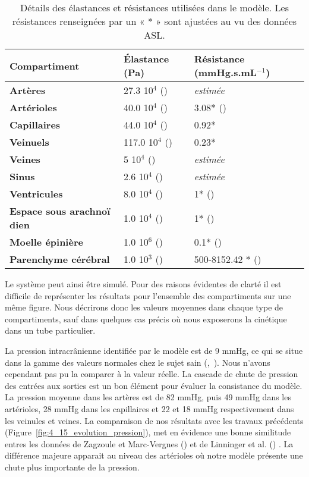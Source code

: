\begin {table}
	\caption{Détails des élastances et résistances utilisées dans le modèle. Les résistances renseignées par un « * » sont
ajustées au vu des données ASL.} 
	\label{tab:elastances} 
	\centering
	\begin{tabularx}{\linewidth}{  X | X | X }

	{\bf Compartiment}  & { \bf \'Elastance (Pa)} & {\bf Résistance (mmHg.s.mL$^{-1}$)} \\
\hline
	{\bf Artères} & 27.3 10$^4$ (\cite{Zagzoule1986}) & {\em estimée}\\
{\bf Artérioles} & 40.0 10$^4$ (\cite{Zagzoule1986}) & 3.08$\ast$ (\cite{Linninger2009}) \\
{\bf Capillaires} & 44.0 10$^4$ (\cite{Zagzoule1986}) & 0.92$\ast$ \\
{\bf Veinuels} & 117.0 10$^4$ (\cite{Zagzoule1986}) & 0.23$\ast$ \\
{\bf Veines} & 5 10$^4$ (\cite{Zagzoule1986}) & {\em estimée}\\
{\bf Sinus} & 2.6 10$^4$ (\cite{Zagzoule1986}) & {\em estimée}\\
{\bf Ventricules} & 8.0 10$^4$ (\cite{Smillie2004}) & 1$\ast$ (\cite{Linninger2009}) \\
{\bf Espace sous arachno\"i dien} & 1.0 10$^4$ (\cite{Zagzoule1986}) & 1$\ast$ (\cite{Linninger2009}) \\
{\bf Moelle épinière} & 1.0 10$^6$ (\cite{Smillie2004}) & 0.1$\ast$ (\cite{Linninger2009}) \\
{\bf Parenchyme cérébral} & 1.0 10$^3$ (\cite{Smillie2004}) & 500-8152.42 $\ast$ (\cite{Linninger2009}) \\
	\end{tabularx}
\end{table}





Le système peut ainsi être simulé. Pour des raisons évidentes de clarté il est difficile de
représenter les résultats pour l’ensemble des compartiments sur une même figure. Nous décrirons
donc les valeurs moyennes dans chaque type de compartiments, sauf dans quelques cas précis où nous
exposerons la cinétique dans un tube particulier.

La pression intracrânienne identifiée par le modèle est de 9 mmHg, ce qui se situe dans la
gamme des valeurs normales chez le sujet sain (\cite{Steiner2006},~\cite{Pattinson2005}). Nous n’avons cependant pas pu la comparer
à la valeur réelle. La cascade de chute de pression des entrées aux sorties est un bon élément pour
évaluer la consistance du modèle. La pression moyenne dans les artères est de 82 mmHg, puis 49
mmHg dans les artérioles, 28 mmHg dans les capillaires et 22 et 18 mmHg respectivement dans les
veinules et veines. La comparaison de nos résultats avec les travaux précédents (Figure~\ref{fig:4_15_evolution_pression}), met en évidence une bonne similitude entres les données de Zagzoule et Marc-Vergnes (\cite{Zagzoule1986}) et de Linninger
et al. (\cite{Linninger2009}) . La différence majeure apparait au niveau des artérioles où notre modèle présente une chute
plus importante de la pression.

